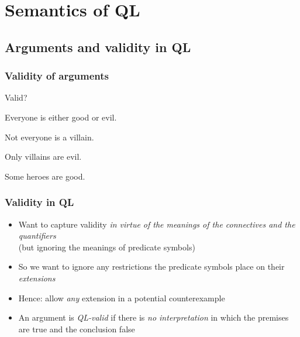 ﻿%

\setcounter{section}{8}

\section{Semantics of QL}

\begin{frame}

\scriptsize{\tableofcontents}

\end{frame}

\subsection{Arguments and validity in QL}

\begin{frame}
  \frametitle{Validity of arguments}

Valid? 

  \begin{earg}
    \item[] Everyone is either good or evil.
    \item[] Not everyone is a villain.
    \item[] Only villains are evil.
    \item[\therefore] Some heroes are good.
  \end{earg}

\end{frame}

\begin{frame}
\frametitle{Validity in QL}

\begin{itemize}[<+->]
\item Want to capture validity \emph{in virtue of the meanings of the
  connectives and the quantifiers} \\ (but ignoring the meanings of predicate
  symbols)
\item So we want to ignore any restrictions the predicate symbols place on their \emph{extensions}
\item Hence: allow \emph{any} extension in a potential counterexample
\item An argument is \emph{QL-valid} if there is \emph{no interpretation} in which the premises are true and the conclusion false
\end{itemize}
\end{frame}


